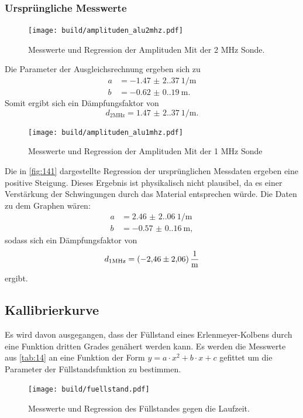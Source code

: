 \subsubsection{Ursprüngliche Messwerte}
\begin{figure}[H]
    \centering
    \caption{Messwerte und Regression der Amplituden Mit der 2 $\unit{\mega\hertz}$ Sonde.}
    \label{fig:131}
    \texttt{[image: build/amplituden\_alu2mhz.pdf]}
\end{figure}
\noindent Die Parameter der Ausgleichsrechnung ergeben sich zu 
\begin{align*}
    a &= \qty{-1.47(2.37)}{1 \per\meter}\\
    b &= \qty{-0.62(0.19)}{\meter}.
\end{align*}
Somit ergibt sich ein Dämpfungsfaktor von 
\begin{equation}
    d_{2 \unit{\mega\hertz}} = \qty{1.47(2.37)}{1 \per\meter}.
\end{equation}

\begin{figure}[H]
    \centering
    \caption{Messwerte und Regression der Amplituden Mit der 1 $\unit{\mega\hertz}$ Sonde }
    \label{fig:141}
    \texttt{[image: build/amplituden\_alu1mhz.pdf]}
\end{figure}
\noindent Die in \autoref{fig:141} dargestellte Regression
der ursprünglichen Messdaten ergeben eine positive Steigung. Dieses Ergebnis
ist physikalisch nicht plausibel, da es einer Verstärkung der Schwingungen
durch das Material entsprechen würde.
Die Daten zu dem Graphen wären:
\begin{align*}
    a &= \qty{2.46(2.06)}{1 \per\meter}\\
    b &= \qty{-0.57(0.16)}{\meter},
\end{align*}
sodass sich ein Dämpfungsfaktor von 
\begin{equation}
    d_{1 \unit{\mega\hertz}} = \qty{-2.46 \pm 2.06}{\per\meter}
\end{equation}
ergibt.

\subsection{Kallibrierkurve}
Es wird davon ausgegangen, dass der Füllstand eines Erlenmeyer-Kolbens durch
eine Funktion dritten Grades genähert werden kann. Es werden die Messwerte 
aus \autoref{tab:14} an eine Funktion der Form $y = a \cdot x^2 + b \cdot x + c $ gefittet 
um die Parameter der Füllstandsfunktion zu bestimmen. 
\begin{figure}[H]
    \centering
    \caption{Messwerte und Regression des Füllstandes gegen die Laufzeit.}
    \label{fig:15}
    \texttt{[image: build/fuellstand.pdf]}
\end{figure}

